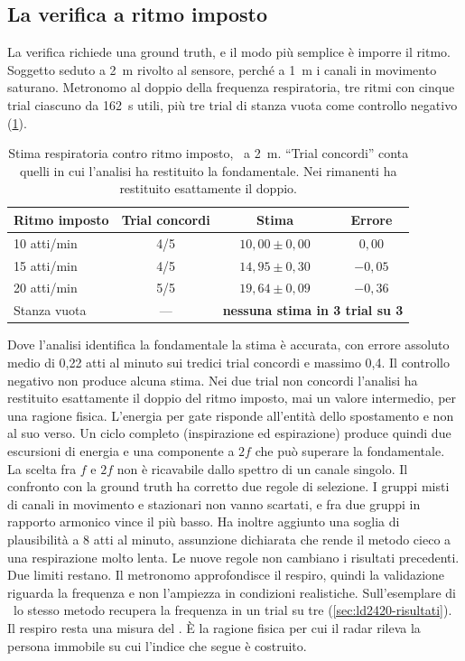 \subsection{La verifica a ritmo imposto}
\label{sec:respiro-metronomo}

La verifica richiede una ground truth, e il modo più semplice è imporre il ritmo.
Soggetto seduto a 2~m rivolto al sensore, perché a 1~m i canali in movimento
saturano. Metronomo al doppio della frequenza respiratoria, tre ritmi con cinque trial
ciascuno da 162~s utili, più tre trial di stanza vuota come controllo negativo
(\cref{tab:respiro-metronomo}).

\begin{table}[htbp]
\centering
\caption{Stima respiratoria contro ritmo imposto, \ldb\ a 2~m. ``Trial concordi''
conta quelli in cui l'analisi ha restituito la fondamentale. Nei rimanenti ha
restituito esattamente il doppio.}
\label{tab:respiro-metronomo}
\small
\begin{tabular}{@{}lccc@{}}
\toprule
Ritmo imposto & Trial concordi & Stima & Errore \\
\midrule
10 atti/min & 4/5 & $10{,}00 \pm 0{,}00$ & $0{,}00$ \\
15 atti/min & 4/5 & $14{,}95 \pm 0{,}30$ & $-0{,}05$ \\
20 atti/min & 5/5 & $19{,}64 \pm 0{,}09$ & $-0{,}36$ \\
\midrule
Stanza vuota & --- & \multicolumn{2}{c}{\textbf{nessuna stima in 3 trial su 3}} \\
\bottomrule
\end{tabular}
\end{table}

Dove l'analisi identifica la fondamentale la stima è accurata, con errore assoluto
medio di 0,22 atti al minuto sui tredici trial concordi e massimo 0,4. Il controllo
negativo non produce alcuna stima. Nei due trial non concordi l'analisi ha restituito
esattamente il doppio del ritmo imposto, mai un valore intermedio, per una ragione
fisica. L'energia per gate risponde all'entità dello spostamento e non al suo verso.
Un ciclo completo (inspirazione ed espirazione) produce quindi due escursioni di
energia e una componente a $2f$ che può superare la fondamentale. La scelta fra $f$ e
$2f$ non è ricavabile dallo spettro di un canale singolo. Il confronto con la ground
truth ha corretto due regole di selezione. I gruppi misti di canali in movimento e
stazionari non vanno scartati, e fra due gruppi in rapporto armonico vince il più
basso. Ha inoltre aggiunto una soglia di plausibilità a 8 atti al minuto, assunzione
dichiarata che rende il metodo cieco a una respirazione molto lenta. Le nuove regole
non cambiano i risultati precedenti. Due limiti restano. Il metronomo approfondisce il
respiro, quindi la validazione riguarda la frequenza e non l'ampiezza in condizioni
realistiche. Sull'esemplare di \ldc\ lo stesso metodo recupera la frequenza in un
trial su tre (\cref{sec:ld2420-risultati}). Il respiro resta una misura del \ldb. È la
ragione fisica per cui il radar rileva la persona immobile su cui l'indice che segue è
costruito.

